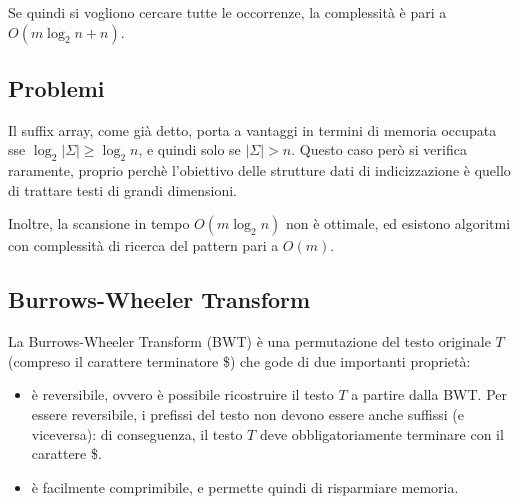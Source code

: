Se quindi si vogliono cercare tutte le occorrenze, la complessità è pari a
$O(m \log_2 n + n)$.

\subsection*{Problemi}
Il suffix array, come già detto, porta a vantaggi in termini di memoria occupata
sse $\log_2 |\Sigma| \ge \log_2 n$, e quindi solo se $|\Sigma| > n$.
Questo caso però si verifica raramente,
proprio perchè l'obiettivo delle strutture dati di indicizzazione è quello di
trattare testi di grandi dimensioni.

Inoltre, la scansione in tempo $O(m \log_2 n)$ non è ottimale, ed esistono
algoritmi con complessità di ricerca del pattern pari a $O(m)$.

\subsection{Burrows-Wheeler Transform}
\begin{defn}
    La Burrows-Wheeler Transform (BWT) è una permutazione del testo originale
    $T$ (compreso il carattere terminatore \$) che gode di due importanti
    proprietà:
    \begin{itemize}
        \item è reversibile, ovvero è possibile ricostruire il testo $T$ a
        partire dalla BWT. Per essere reversibile, i prefissi del testo non
        devono essere anche suffissi (e viceversa): di conseguenza, il testo
        $T$ deve obbligatoriamente terminare con il carattere \$.
        \item è facilmente comprimibile, e permette quindi di risparmiare
        memoria.
    \end{itemize}
\end{defn}

